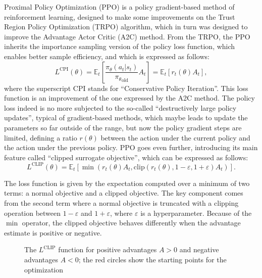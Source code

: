 \documentclass[a4paper, 12pt]{article}
\numberwithin{equation}{section}
\begin{document}
Proximal Policy Optimization (PPO) is a policy gradient-based method of reinforcement learning, designed to make some improvements on the Trust Region Policy Optimization (TRPO) algorithm, which in turn was designed to improve the Advantage Actor Critic (A2C) method. From the TRPO, the PPO inherits the importance sampling version of the policy loss function, which enables better sample efficiency, and which is expressed as follows:
\begin{equation}
	L^\mathrm{CPI}\left(\theta\right)=\mathbb{E}_t\left[\frac{\pi_\theta\left(a_t|s_t\right)}{{\pi_\theta}_\mathrm{old}}A_t\right]=\mathbb{E}_t\left[r_t\left(\theta\right)A_t\right],
\end{equation}
where the superscript $\mathrm{CPI}$ stands for ``Conservative Policy Iteration''. This loss function is an improvement of the one expressed by the A2C method. The policy loss indeed is no more subjected to the so-called ``destructively large policy updates'', typical of gradient-based methods, which maybe leads to update the parameters so far outside of the range, but now the policy gradient steps are limited, defining a ratio $r\left(\theta\right)$ between the action under the current policy and the action under the previous policy. PPO goes even further, introducing its main feature called ``clipped surrogate objective'', which can be expressed as follows:
\begin{equation}
	L^\mathrm{CLIP}\left(\theta\right)=\mathbb{E}_t\left[\min\left(r_t\left(\theta\right)A_t,\mathrm{clip}\left(r_t\left(\theta\right),1-\varepsilon,1+\varepsilon\right)A_t\right)\right].
\end{equation}

The loss function is given by the expectation computed over a minimum of two terms: a normal objective and a clipped objective. The key component comes from the second term where a normal objective is truncated with a clipping operation between $1-\varepsilon$ and $1+\varepsilon$, where $\varepsilon$ is a hyperparameter. Because of the $\min$ operator, the clipped objective behaves differently when the advantage estimate is positive or negative.

\begin{figure}[h]
	\centering
		\caption[The $L^\mathrm{CLIP}$ function for positive and negative advantages]{The $L^\mathrm{CLIP}$ function for positive advantages $A>0$ and negative advantages $A<0$; the red circles show the starting points for the optimization}
	\label{fig:clipped}
\end{figure}
\end{document}
